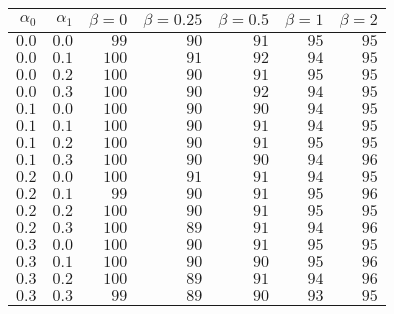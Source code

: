 \begin{tabular}{rr|rrrrr}
\hline\hline
 $\alpha_0$ & $\alpha_1$ & $\beta=0$ & $\beta=0.25$ & $\beta=0.5$ & $\beta=1$ & $\beta=2$ \\ 
 \hline
$0.0$ & $0.0$ & $ 99$ & $90$ & $91$ & $95$ & $95$\\ 
$0.0$ & $0.1$ & $100$ & $91$ & $92$ & $94$ & $95$\\ 
$0.0$ & $0.2$ & $100$ & $90$ & $91$ & $95$ & $95$\\ 
$0.0$ & $0.3$ & $100$ & $90$ & $92$ & $94$ & $95$\\ 
$0.1$ & $0.0$ & $100$ & $90$ & $90$ & $94$ & $95$\\ 
$0.1$ & $0.1$ & $100$ & $90$ & $91$ & $94$ & $95$\\ 
$0.1$ & $0.2$ & $100$ & $90$ & $91$ & $95$ & $95$\\ 
$0.1$ & $0.3$ & $100$ & $90$ & $90$ & $94$ & $96$\\ 
$0.2$ & $0.0$ & $100$ & $91$ & $91$ & $94$ & $95$\\ 
$0.2$ & $0.1$ & $ 99$ & $90$ & $91$ & $95$ & $96$\\ 
$0.2$ & $0.2$ & $100$ & $90$ & $91$ & $95$ & $95$\\ 
$0.2$ & $0.3$ & $100$ & $89$ & $91$ & $94$ & $96$\\ 
$0.3$ & $0.0$ & $100$ & $90$ & $91$ & $95$ & $95$\\ 
$0.3$ & $0.1$ & $100$ & $90$ & $90$ & $95$ & $96$\\ 
$0.3$ & $0.2$ & $100$ & $89$ & $91$ & $94$ & $96$\\ 
$0.3$ & $0.3$ & $ 99$ & $89$ & $90$ & $93$ & $95$\\ 
 \hline 
 \end{tabular}